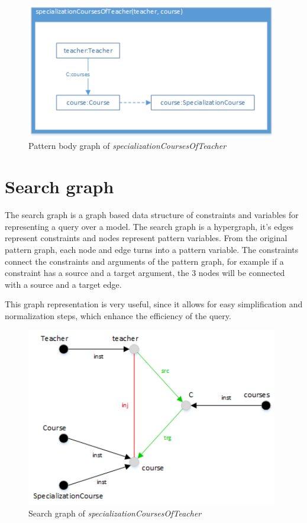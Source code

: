 \begin{figure}[!ht]
\centering
\includegraphics[width=110mm,
keepaspectratio]{figures/pattern_body_graph.png}
\caption{Pattern body graph of \emph{specializationCoursesOfTeacher}}
\label{fig:patternBodyGraph}
\end{figure}

\section{Search graph}\label{sec:SearchGraph}

The search graph is a graph based data structure of constraints and variables
for representing a query over a model. The search graph is a hypergraph, it's
edges represent constraints and nodes represent pattern variables. From the
original pattern graph, each node and edge turns into a pattern variable. The
constraints connect the constraints and arguments of the pattern graph, for
example if a constraint has a source and a target argument, the 3 nodes will be
connected with a source and a target edge.

This graph representation is very useful, since it allows for easy
simplification and normalization steps, which enhance the efficiency of the
query.

\begin{figure}[!ht]
\centering
\includegraphics[width=110mm,
keepaspectratio]{figures/search_graph.png}
\caption{Search graph of \emph{specializationCoursesOfTeacher}}
\label{fig:searchGraph}
\end{figure}

